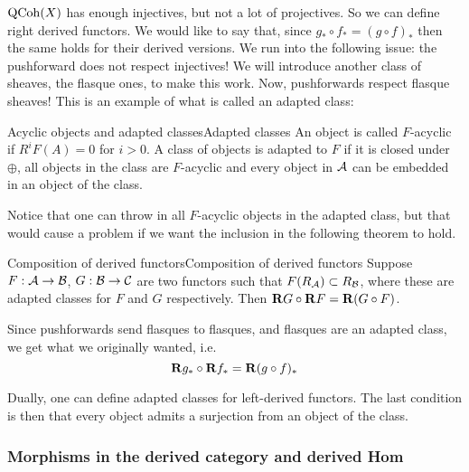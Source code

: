 $\operatorname{QCoh}(X)$ has enough injectives, but not a lot of projectives. So we can define right derived functors. We would like to say that, since $g_*\circ f_*=(g\circ f)_*$ then the same holds for their derived versions. We run into the following issue: the pushforward does not respect injectives! We will introduce another class of sheaves, the flasque ones, to make this work. Now, pushforwards respect flasque sheaves! This is an example of what is called an adapted class:

\begin{definition}{Acyclic objects and adapted classes}{Adapted classes}
     An object is called $F$-acyclic if $R^iF(A)=0$ for $i>0$. A class of objects is adapted to $F$ if it is closed under $\oplus$, all objects in the class are $F$-acyclic and every object in $\mathcal{A}$ can be embedded in an object of the class.
\end{definition}

Notice that one can throw in all $F$-acyclic objects in the adapted class, but that would cause a problem if we want the inclusion in the following theorem to hold.

\begin{theorem}{Composition of derived functors}{Composition of derived functors}
    Suppose $F:\mathcal{A}\to\mathcal{B}$, $G:\mathcal{B}\to\mathcal{C}$ are two functors such that $F(R_{\mathcal{A}})\subset R_{\mathcal{B}}$, where these are adapted classes for $F$ and $G$ respectively. Then $\mathbf{R} G\circ\mathbf{R} F = \mathbf{R}(G\circ F)$.
\end{theorem}

Since pushforwards send flasques to flasques, and flasques are an adapted class, we get what we originally wanted, i.e. $$\mathbf{R} g_* \circ \mathbf{R} f_* = \mathbf{R} (g\circ f)_*$$


\begin{remark}{}{}
    Dually, one can define adapted classes for left-derived functors. The last condition is then that every object admits a surjection from an object of the class.
\end{remark}

\subsubsection{Morphisms in the derived category and derived Hom}

